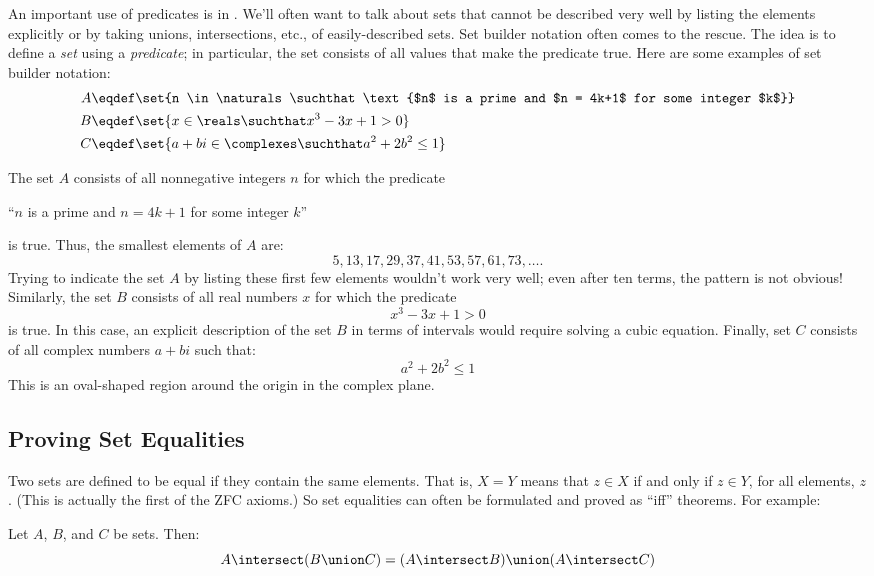 An important use of predicates is in .  We'll
often want to talk about sets that cannot be described very well by
listing the elements explicitly or by taking unions, intersections,
etc., of easily-described sets.  Set builder notation often comes to the
rescue.  The idea is to define a \emph{set} using a \emph{predicate};
in particular, the set consists of all values that make the predicate
true.  Here are some examples of set builder notation:
\begin{align*}
A & \eqdef \set{n \in \naturals \suchthat \text{$n$ is a prime and $n =
    4k+1$ for some integer $k$}} \\
B & \eqdef \set{x \in \reals \suchthat x^3 - 3 x + 1 > 0} \\
C & \eqdef \set{a + b i \in \complexes \suchthat a^2 + 2 b^2 \leq 1}
\end{align*}

The set $A$ consists of all nonnegative integers $n$ for which the
predicate
\begin{center}
``$n$ is a prime and $n = 4k+1$ for some integer $k$''
\end{center}
is true.  Thus, the smallest elements of $A$ are:
\[
5, 13, 17, 29, 37, 41, 53, 57, 61, 73, \ldots.
\]
Trying to indicate the set $A$ by listing these first few elements
wouldn't work very well; even after ten terms, the pattern is not
obvious!  Similarly, the set $B$ consists of all real numbers $x$ for
which the predicate
\[
x^3 - 3x + 1 > 0
\]
is true.  In this case, an explicit description of the set $B$ in
terms of intervals would require solving a cubic equation.  Finally,
set $C$ consists of all complex numbers $a + b i$ such that:
\[
a^2 + 2 b^2 \leq 1
\]
This is an oval-shaped region around the origin in the complex plane.

\subsection{Proving Set Equalities}

Two sets are defined to be equal if they contain the same elements.  That
is, $X = Y$ means that $z \in X$ if and only if $z \in Y$, for all
elements, $z$.  (This is actually the first of the ZFC axioms.)  So set
equalities can often be formulated and proved as ``iff'' theorems.  For
example:
\begin{theorem}
Let $A$, $B$, and $C$ be sets.  Then:
\begin{equation}\label{set-distrib}
A \intersect (B \union C) = (A \intersect B) \union (A \intersect C)
\end{equation}
\end{theorem}

